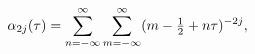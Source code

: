 \[\alpha_{2j}(\tau)=\sum_{n=-\infty}^{\infty}\sum_{m=-\infty}^{\infty}(m-\tfrac{%
1}{2}+n\tau)^{-2j},\]